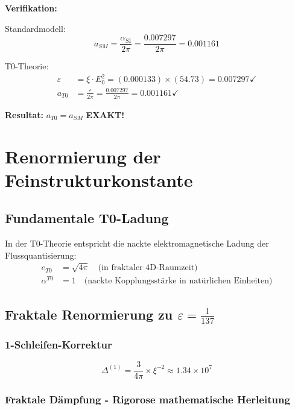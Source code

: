 \documentclass[12pt,a4paper]{article}
\numberwithin{equation}{section}
\newcommand{\xipar}{\xi}
\newcommand{\epsilonT}{\varepsilon}
\newcommand{\alphaSI}{\alpha_{\text{SI}}}
\newcommand{\alphaT}{\alpha^{T0}}
\newcommand{\Eo}{E_0}
\begin{document}
	\textbf{Verifikation:}
	
	Standardmodell:
	\begin{equation}
		a_{SM} = \frac{\alphaSI}{2\pi} = \frac{0.007297}{2\pi} = 0.001161
	\end{equation}
	
	T0-Theorie:
	\begin{align}
		\epsilonT &= \xipar \cdot \Eo^2 = (0.000133) \times (54.73) = 0.007297 \checkmark\\
		a_{T0} &= \frac{\epsilonT}{2\pi} = \frac{0.007297}{2\pi} = 0.001161 \checkmark
	\end{align}
	
	\textbf{Resultat:} $a_{T0} = a_{SM}$ \textbf{EXAKT!}
	
	\section{Renormierung der Feinstrukturkonstante}
	
	\subsection{Fundamentale T0-Ladung}
	
	In der T0-Theorie entspricht die nackte elektromagnetische Ladung der Flussquantisierung:
	\begin{align}
		e_{T0} &= \sqrt{4\pi} \quad \text{(in fraktaler 4D-Raumzeit)}\\
		\alphaT &= 1 \quad \text{(nackte Kopplungsstärke in natürlichen Einheiten)}
		\label{eq:naked_coupling}
	\end{align}
	
	\subsection{Fraktale Renormierung zu $\epsilonT = \frac{1}{137}$}
	
	\subsubsection{1-Schleifen-Korrektur}
	
	\begin{equation}
		\Delta^{(1)} = \frac{3}{4\pi} \times \xipar^{-2} \approx 1.34 \times 10^7
		\label{eq:one_loop}
	\end{equation}
	
	\subsubsection{Fraktale Dämpfung - Rigorose mathematische Herleitung}
	
\end{document}
